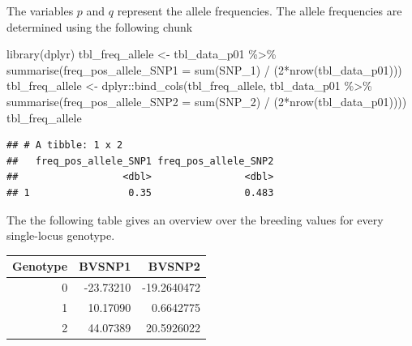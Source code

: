 \documentclass[
]{article}
\newenvironment{Shaded}{\begin{snugshade}}{\end{snugshade}}
\newcommand{\AttributeTok}[1]{\textcolor[rgb]{0.77,0.63,0.00}{#1}}
\newcommand{\DecValTok}[1]{\textcolor[rgb]{0.00,0.00,0.81}{#1}}
\newcommand{\FunctionTok}[1]{\textcolor[rgb]{0.00,0.00,0.00}{#1}}
\newcommand{\NormalTok}[1]{#1}
\newcommand{\OtherTok}[1]{\textcolor[rgb]{0.56,0.35,0.01}{#1}}
\newcommand{\SpecialCharTok}[1]{\textcolor[rgb]{0.00,0.00,0.00}{#1}}
\begin{document}
The variables \(p\) and \(q\) represent the allele frequencies. The
allele frequencies are determined using the following chunk

\begin{Shaded}
\begin{Highlighting}[]
\FunctionTok{library}\NormalTok{(dplyr)}
\NormalTok{tbl\_freq\_allele }\OtherTok{\textless{}{-}}\NormalTok{ tbl\_data\_p01 }\SpecialCharTok{\%\textgreater{}\%} 
  \FunctionTok{summarise}\NormalTok{(}\AttributeTok{freq\_pos\_allele\_SNP1 =} \FunctionTok{sum}\NormalTok{(SNP\_1) }\SpecialCharTok{/}\NormalTok{ (}\DecValTok{2}\SpecialCharTok{*}\FunctionTok{nrow}\NormalTok{(tbl\_data\_p01)))}
\NormalTok{tbl\_freq\_allele }\OtherTok{\textless{}{-}}\NormalTok{ dplyr}\SpecialCharTok{::}\FunctionTok{bind\_cols}\NormalTok{(tbl\_freq\_allele,}
\NormalTok{                                    tbl\_data\_p01 }\SpecialCharTok{\%\textgreater{}\%} 
  \FunctionTok{summarise}\NormalTok{(}\AttributeTok{freq\_pos\_allele\_SNP2 =} \FunctionTok{sum}\NormalTok{(SNP\_2) }\SpecialCharTok{/}\NormalTok{ (}\DecValTok{2}\SpecialCharTok{*}\FunctionTok{nrow}\NormalTok{(tbl\_data\_p01))))}
\NormalTok{tbl\_freq\_allele}
\end{Highlighting}
\end{Shaded}

\begin{verbatim}
## # A tibble: 1 x 2
##   freq_pos_allele_SNP1 freq_pos_allele_SNP2
##                  <dbl>                <dbl>
## 1                 0.35                0.483
\end{verbatim}

\begin{Shaded}
\end{Shaded}

The the following table gives an overview over the breeding values for
every single-locus genotype.

\begin{longtable}[]{@{}rrr@{}}
\toprule()
Genotype & BVSNP1 & BVSNP2 \\
\midrule()
\endhead
0 & -23.73210 & -19.2640472 \\
1 & 10.17090 & 0.6642775 \\
2 & 44.07389 & 20.5926022 \\
\bottomrule()
\end{longtable}
\end{document}
